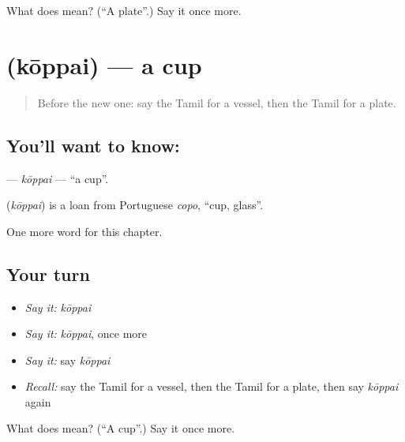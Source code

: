 \begin{tcolorbox}[breakable,colback=teal!4,colframe=teal!35!black,title={Before you move on}]
What does  mean? (\textquotedblleft{}A plate\textquotedblright{}.) Say it once more.
\end{tcolorbox}
\section[\texorpdfstring{\ta{கோப்பை} (kōppai)}{கோப்பை (kōppai)}]{ (kōppai) — a cup}

\label{lesson:TA-C118-koppai}



\begin{quote}
Before the new one: say the Tamil for a vessel, then the Tamil for a plate.
\end{quote}

\subsection*{You'll want to know: }
\textbf{} — \emph{kōppai} — \textquotedblleft{}a cup\textquotedblright{}.

\begin{cousinweb}
\textbf{} (\emph{kōppai}) is a loan from Portuguese \emph{copo}, \textquotedblleft{}cup, glass\textquotedblright{}.
\end{cousinweb}

\begin{grammarlens}[title={What you've built}]
One more word for this chapter.
\end{grammarlens}

\subsection*{Your turn}
\begin{itemize}
\raggedright
  \item \emph{Say it:} \emph{kōppai}
  \item \emph{Say it:} \emph{kōppai}, once more
  \item \emph{Say it:} say \emph{kōppai}
  \item \emph{Recall:} say the Tamil for a vessel, then the Tamil for a plate, then say \emph{kōppai} again
\end{itemize}

\begin{tcolorbox}[breakable,colback=teal!4,colframe=teal!35!black,title={Before you move on}]
What does  mean? (\textquotedblleft{}A cup\textquotedblright{}.) Say it once more.
\end{tcolorbox}
